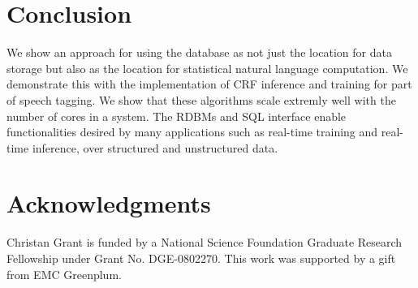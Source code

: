 \documentclass[11pt,letterpaper]{article}
\begin{document}

\section{Conclusion}
We show an approach for using the database as not just the location for
data storage but also as the location for statistical natural language 
computation.
We demonstrate this with the implementation of CRF inference and training 
for part of speech tagging.
We show that these algorithms scale extremly well with the number of cores
in a system.
The RDBMs and SQL interface enable functionalities desired by many 
applications such as real-time training and real-time inference, over
structured and unstructured data.




\section*{Acknowledgments}
Christan Grant is funded by a National
Science Foundation Graduate Research Fellowship under Grant No. DGE-0802270.
This work was supported by a gift from EMC Greenplum.


%

\end{document}
